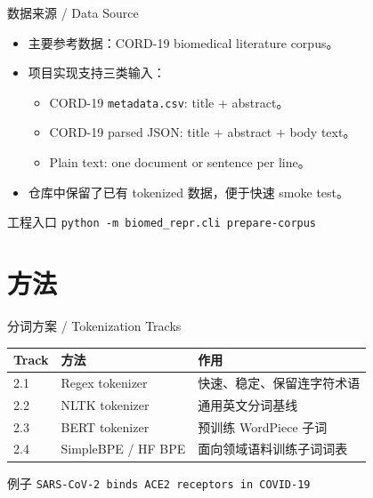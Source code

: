 \documentclass[aspectratio=169,10pt]{ctexbeamer}
\begin{document}
\begin{frame}{数据来源 / Data Source}
  \begin{itemize}
    \item 主要参考数据：CORD-19 biomedical literature corpus。
    \item 项目实现支持三类输入：
      \begin{itemize}
        \item CORD-19 \texttt{metadata.csv}: title + abstract。
        \item CORD-19 parsed JSON: title + abstract + body text。
        \item Plain text: one document or sentence per line。
      \end{itemize}
    \item 仓库中保留了已有 tokenized 数据，便于快速 smoke test。
  \end{itemize}
  \begin{block}{工程入口}
    \texttt{python -m biomed\_repr.cli prepare-corpus}
  \end{block}
\end{frame}

\section{方法}

\begin{frame}{分词方案 / Tokenization Tracks}
  \begin{table}
    \centering
    \begin{tabular}{lll}
      \toprule
      Track & 方法 & 作用 \\
      \midrule
      2.1 & Regex tokenizer & 快速、稳定、保留连字符术语 \\
      2.2 & NLTK tokenizer & 通用英文分词基线 \\
      2.3 & BERT tokenizer & 预训练 WordPiece 子词 \\
      2.4 & SimpleBPE / HF BPE & 面向领域语料训练子词词表 \\
      \bottomrule
    \end{tabular}
  \end{table}
  \begin{block}{例子}
    \texttt{SARS-CoV-2 binds ACE2 receptors in COVID-19}
  \end{block}
\end{frame}
\end{document}
